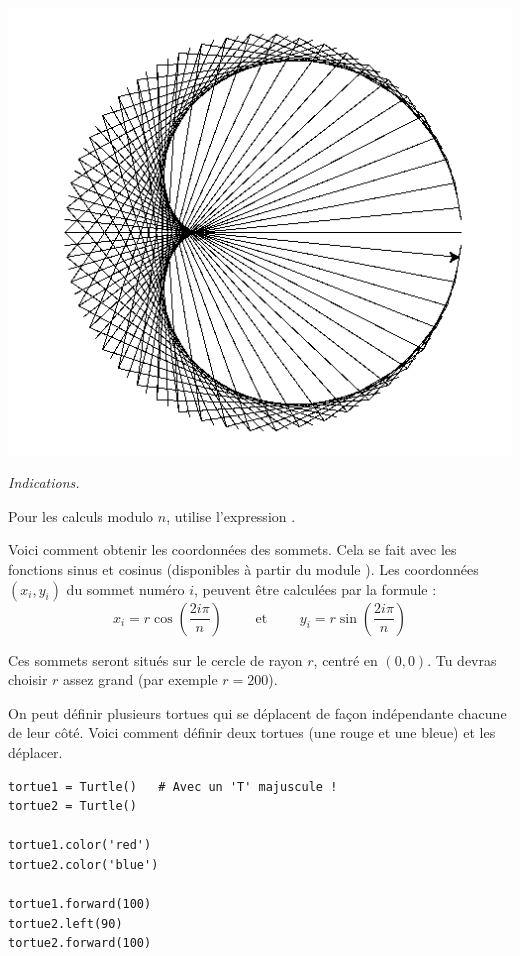 \documentclass[11pt,class=report,crop=false]{standalone}
\begin{document}
\begin{activite}
\begin{center}
\includegraphics[scale=\myscale,scale=0.5]{ecran-tortue-5b}
\end{center}

\emph{Indications.}

Pour les calculs modulo $n$, utilise l'expression .


Voici comment obtenir les coordonnées des sommets. Cela se fait avec les fonctions sinus et cosinus (disponibles à partir du module ).
Les coordonnées $(x_i,y_i)$ du sommet numéro $i$, peuvent être calculées par la formule :
$$x_i = r \cos\left(\frac{2 i \pi}{n}\right) \qquad \text{ et } \qquad y_i = r\sin\left(\frac{2 i \pi}{n}\right)$$

Ces sommets seront situés sur le cercle de rayon $r$, centré en $(0,0)$. 
Tu devras choisir $r$ assez grand (par exemple $r=200$).



\end{activite}


\begin{cours}

On peut définir plusieurs tortues qui se déplacent de façon indépendante chacune de leur côté.
Voici comment définir deux tortues (une rouge et une bleue) et les déplacer.

\begin{lstlisting}
tortue1 = Turtle()   # Avec un 'T' majuscule !
tortue2 = Turtle()

tortue1.color('red')
tortue2.color('blue')

tortue1.forward(100)
tortue2.left(90)
tortue2.forward(100)
\end{lstlisting}

\end{cours}
\end{document}
